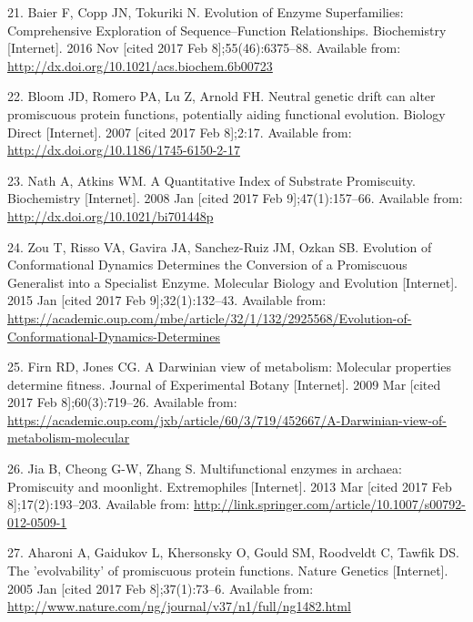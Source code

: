 \documentclass[12pt,twoside]{reedthesis}
\begin{document}
  \hypertarget{ref-baier_evolution_2016}{}
  21. Baier F, Copp JN, Tokuriki N. Evolution of Enzyme Superfamilies:
  Comprehensive Exploration of Sequence--Function Relationships.
  Biochemistry {[}Internet{]}. 2016 Nov {[}cited 2017 Feb
  8{]};55(46):6375--88. Available from:
  \url{http://dx.doi.org/10.1021/acs.biochem.6b00723}
  
  \hypertarget{ref-bloom_neutral_2007}{}
  22. Bloom JD, Romero PA, Lu Z, Arnold FH. Neutral genetic drift can
  alter promiscuous protein functions, potentially aiding functional
  evolution. Biology Direct {[}Internet{]}. 2007 {[}cited 2017 Feb
  8{]};2:17. Available from:
  \url{http://dx.doi.org/10.1186/1745-6150-2-17}
  
  \hypertarget{ref-nath_quantitative_2008}{}
  23. Nath A, Atkins WM. A Quantitative Index of Substrate Promiscuity.
  Biochemistry {[}Internet{]}. 2008 Jan {[}cited 2017 Feb
  9{]};47(1):157--66. Available from:
  \url{http://dx.doi.org/10.1021/bi701448p}
  
  \hypertarget{ref-zou_evolution_2015}{}
  24. Zou T, Risso VA, Gavira JA, Sanchez-Ruiz JM, Ozkan SB. Evolution of
  Conformational Dynamics Determines the Conversion of a Promiscuous
  Generalist into a Specialist Enzyme. Molecular Biology and Evolution
  {[}Internet{]}. 2015 Jan {[}cited 2017 Feb 9{]};32(1):132--43. Available
  from:
  \url{https://academic.oup.com/mbe/article/32/1/132/2925568/Evolution-of-Conformational-Dynamics-Determines}
  
  \hypertarget{ref-firn_darwinian_2009}{}
  25. Firn RD, Jones CG. A Darwinian view of metabolism: Molecular
  properties determine fitness. Journal of Experimental Botany
  {[}Internet{]}. 2009 Mar {[}cited 2017 Feb 8{]};60(3):719--26. Available
  from:
  \url{https://academic.oup.com/jxb/article/60/3/719/452667/A-Darwinian-view-of-metabolism-molecular}
  
  \hypertarget{ref-jia_multifunctional_2013}{}
  26. Jia B, Cheong G-W, Zhang S. Multifunctional enzymes in archaea:
  Promiscuity and moonlight. Extremophiles {[}Internet{]}. 2013 Mar
  {[}cited 2017 Feb 8{]};17(2):193--203. Available from:
  \url{http://link.springer.com/article/10.1007/s00792-012-0509-1}
  
  \hypertarget{ref-aharoni_evolvability_2005}{}
  27. Aharoni A, Gaidukov L, Khersonsky O, Gould SM, Roodveldt C, Tawfik
  DS. The 'evolvability' of promiscuous protein functions. Nature Genetics
  {[}Internet{]}. 2005 Jan {[}cited 2017 Feb 8{]};37(1):73--6. Available
  from: \url{http://www.nature.com/ng/journal/v37/n1/full/ng1482.html}
  
\end{document}
